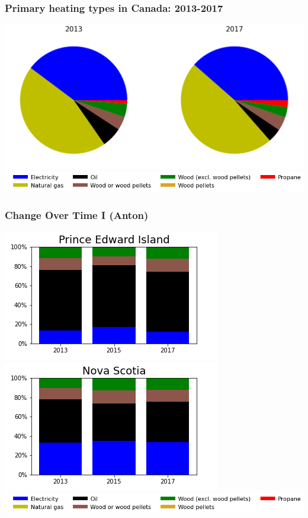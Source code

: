 \documentclass{beamer}
\begin{document}
\begin{frame}
\frametitle{Primary heating types in Canada: 2013-2017}
\includegraphics[width=\textwidth]{Canada20132017.png}\\
\includegraphics[width=\linewidth]{leg_bar.png}
\end{frame}



\begin{frame}
\frametitle{Change Over Time I (Anton)}
\begin{center}
\includegraphics[width=0.5\linewidth]{pe.png}%
\includegraphics[width=0.5\linewidth]{ns.png}\\
\includegraphics[width=0.9\linewidth]{leg_bar.png}
\end{center}
\end{frame}
\end{document}
